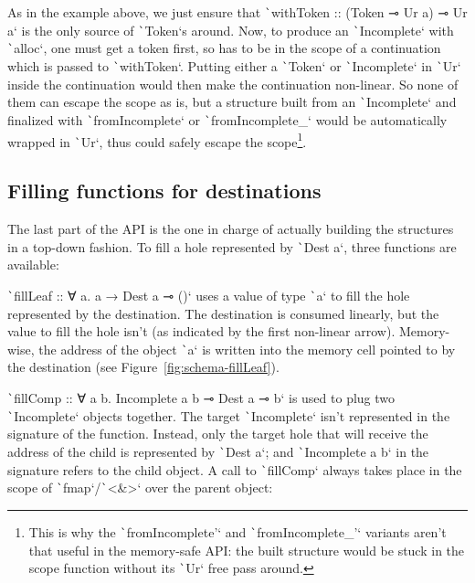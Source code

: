 \documentclass[english]{jflart}
\begin{document}
As in the example above, we just ensure that \texttt`withToken :: (Token ⊸ Ur a) ⊸ Ur a` is the only source of \texttt`Token`s around. Now, to produce an \texttt`Incomplete` with \texttt`alloc`, one must get a token first, so has to be in the scope of a continuation which is passed to \texttt`withToken`. Putting either a \texttt`Token` or \texttt`Incomplete` in \texttt`Ur` inside the continuation would then make the continuation non-linear. So none of them can escape the scope as is, but a structure built from an \texttt`Incomplete` and finalized with \texttt`fromIncomplete` or \texttt`fromIncomplete_` would be automatically wrapped in \texttt`Ur`, thus could safely escape the scope\footnote{This is why the \texttt`fromIncomplete'` and \texttt`fromIncomplete_'` variants aren't that useful in the memory-safe API: the built structure would be stuck in the scope function without its \texttt`Ur` free pass around.}.

\subsection{Filling functions for destinations}

The last part of the API is the one in charge of actually building the structures in a top-down fashion. To fill a hole represented by \texttt`Dest a`, three functions are available:

\texttt`fillLeaf :: ∀ a. a → Dest a ⊸ ()` uses a value of type \texttt`a` to fill the hole represented by the destination. The destination is consumed linearly, but the value to fill the hole isn't (as indicated by the first non-linear arrow). Memory-wise, the address of the object \texttt`a` is written into the memory cell pointed to by the destination (see Figure~\ref{fig:schema-fillLeaf}).

\texttt`fillComp :: ∀ a b. Incomplete a b ⊸ Dest a ⊸ b` is used to plug two \texttt`Incomplete` objects together. The target \texttt`Incomplete` isn't represented in the signature of the function. Instead, only the target hole that will receive the address of the child is represented by \texttt`Dest a`; and \texttt`Incomplete a b` in the signature refers to the child object. A call to \texttt`fillComp` always takes place in the scope of \texttt`fmap`/\texttt`<&>` over the parent object:
\end{document}
